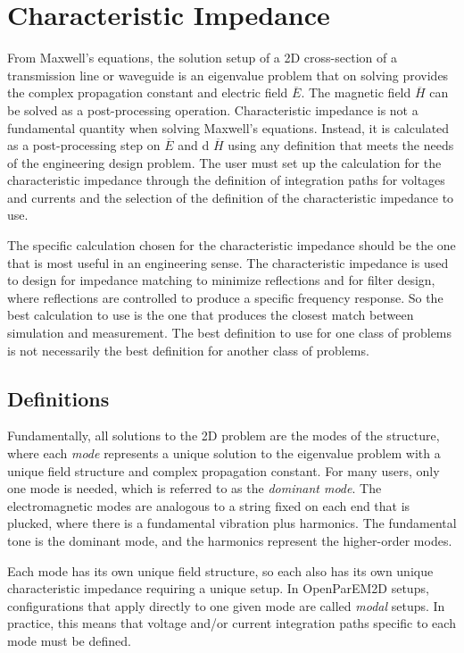 \documentclass[titlepage]{article}
\renewcommand\_{\textunderscore\linebreak[1]}
\begin{document}
\section{Characteristic Impedance}

From Maxwell's equations, the solution setup of a 2D cross-section of a transmission line or waveguide is an eigenvalue problem that on solving provides the complex propagation constant and electric field $\overline{E}$.  The magnetic field $\overline{H}$ can be solved as a post-processing operation.  Characteristic impedance is not a fundamental quantity when solving Maxwell's equations. Instead, it is calculated as a post-processing step on $\overline{E}$ and d $\overline{H}$ using any definition that meets the needs of the engineering design problem.  The user must set up the calculation for the characteristic impedance through the definition of integration paths for voltages and currents and the selection of the definition of the characteristic impedance to use.

The specific calculation chosen for the characteristic impedance should be the one that is most useful in an engineering sense.  The characteristic impedance is used to design for impedance matching to minimize reflections and for filter design, where reflections are controlled to produce a specific frequency response.  So the best calculation to use is the one that produces the closest match between simulation and measurement.  The best definition to use for one class of problems is not necessarily the best definition for another class of problems.

\subsection{Definitions}

Fundamentally, all solutions to the 2D problem are the modes of the structure, where each \textit{mode} represents a unique solution to the eigenvalue problem with a unique field structure and complex propagation constant.  For many users, only one mode is needed, which is referred to as the \textit{dominant mode}.  The electromagnetic modes are analogous to a string fixed on each end that is plucked, where there is a fundamental vibration plus harmonics.  The fundamental tone is the dominant mode, and the harmonics represent the higher-order modes.

Each mode has its own unique field structure, so each also has its own unique characteristic impedance requiring a unique setup.  In OpenParEM2D setups, configurations that apply directly to one given mode are called \textit{modal} setups.  In practice, this means that voltage and/or current integration paths specific to each mode must be defined.
\end{document}
